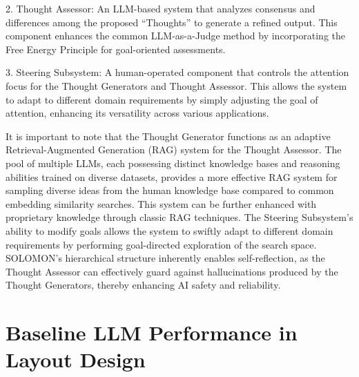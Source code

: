 \documentclass{article}
\begin{document}
2. Thought Assessor: An LLM-based system that analyzes consensus and differences among the proposed ``Thoughts'' to generate a refined output. This component enhances the common LLM-as-a-Judge method \cite{zheng2023judgingllmasajudgemtbenchchatbot, guerreiro2023lookingneedlehaystackcomprehensive, lin2023llmevalunifiedmultidimensionalautomatic, ji2023mitigatinghallucinationlargelanguage} by incorporating the Free Energy Principle for goal-oriented assessments.

3. Steering Subsystem: A human-operated component that controls the attention focus for the Thought Generators and Thought Assessor. This allows the system to adapt to different domain requirements by simply adjusting the goal of attention, enhancing its versatility across various applications.

It is important to note that the Thought Generator functions as an adaptive Retrieval-Augmented Generation (RAG) system for the Thought Assessor. The pool of multiple LLMs, each possessing distinct knowledge bases and reasoning abilities trained on diverse datasets, provides a more effective RAG system for sampling diverse ideas from the human knowledge base compared to common embedding similarity searches. This system can be further enhanced with proprietary knowledge through classic RAG techniques. The Steering Subsystem's ability to modify goals allows the system to swiftly adapt to different domain requirements by performing goal-directed exploration of the search space. SOLOMON's hierarchical structure inherently enables self-reflection, as the Thought Assessor can effectively guard against hallucinations produced by the Thought Generators, thereby enhancing AI safety and reliability.


\section{Baseline LLM Performance in Layout Design}
\end{document}
